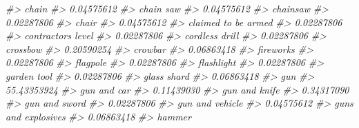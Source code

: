 \documentclass[
]{krantz}
\makeatletter
\newenvironment{Shaded}{\begin{snugshade}}{\end{snugshade}}
\newcommand{\CommentTok}[1]{\textcolor[rgb]{0.37,0.37,0.37}{\textit{#1}}}
\newenvironment{kframe}{%
\medskip{}
\setlength{\fboxsep}{.8em}
 \def\at@end@of@kframe{}%
 \ifinner\ifhmode%
  \def\at@end@of@kframe{\end{minipage}}%
  \begin{minipage}{\columnwidth}%
 \fi\fi%
 \def\FrameCommand##1{\hskip\@totalleftmargin \hskip-\fboxsep
 \colorbox{shadecolor}{##1}\hskip-\fboxsep
     \hskip-\linewidth \hskip-\@totalleftmargin \hskip\columnwidth}%
 \MakeFramed {\advance\hsize-\width
   \@totalleftmargin\z@ \linewidth\hsize
   \@setminipage}}%
 {\par\unskip\endMakeFramed%
 \at@end@of@kframe}
\renewenvironment{Shaded}{\begin{kframe}}{\end{kframe}}
\makeatother
\begin{document}
\begin{Shaded}
\begin{Highlighting}[]
\CommentTok{\#\textgreater{}                            chain }
\CommentTok{\#\textgreater{}                       0.04575612 }
\CommentTok{\#\textgreater{}                        chain saw }
\CommentTok{\#\textgreater{}                       0.04575612 }
\CommentTok{\#\textgreater{}                         chainsaw }
\CommentTok{\#\textgreater{}                       0.02287806 }
\CommentTok{\#\textgreater{}                            chair }
\CommentTok{\#\textgreater{}                       0.04575612 }
\CommentTok{\#\textgreater{}              claimed to be armed }
\CommentTok{\#\textgreater{}                       0.02287806 }
\CommentTok{\#\textgreater{}               contractor\textquotesingle{}s level }
\CommentTok{\#\textgreater{}                       0.02287806 }
\CommentTok{\#\textgreater{}                   cordless drill }
\CommentTok{\#\textgreater{}                       0.02287806 }
\CommentTok{\#\textgreater{}                         crossbow }
\CommentTok{\#\textgreater{}                       0.20590254 }
\CommentTok{\#\textgreater{}                          crowbar }
\CommentTok{\#\textgreater{}                       0.06863418 }
\CommentTok{\#\textgreater{}                        fireworks }
\CommentTok{\#\textgreater{}                       0.02287806 }
\CommentTok{\#\textgreater{}                         flagpole }
\CommentTok{\#\textgreater{}                       0.02287806 }
\CommentTok{\#\textgreater{}                       flashlight }
\CommentTok{\#\textgreater{}                       0.02287806 }
\CommentTok{\#\textgreater{}                      garden tool }
\CommentTok{\#\textgreater{}                       0.02287806 }
\CommentTok{\#\textgreater{}                      glass shard }
\CommentTok{\#\textgreater{}                       0.06863418 }
\CommentTok{\#\textgreater{}                              gun }
\CommentTok{\#\textgreater{}                      55.43353924 }
\CommentTok{\#\textgreater{}                      gun and car }
\CommentTok{\#\textgreater{}                       0.11439030 }
\CommentTok{\#\textgreater{}                    gun and knife }
\CommentTok{\#\textgreater{}                       0.34317090 }
\CommentTok{\#\textgreater{}                    gun and sword }
\CommentTok{\#\textgreater{}                       0.02287806 }
\CommentTok{\#\textgreater{}                  gun and vehicle }
\CommentTok{\#\textgreater{}                       0.04575612 }
\CommentTok{\#\textgreater{}              guns and explosives }
\CommentTok{\#\textgreater{}                       0.06863418 }
\CommentTok{\#\textgreater{}                           hammer }

\end{Highlighting}
\end{Shaded}
\end{document}
